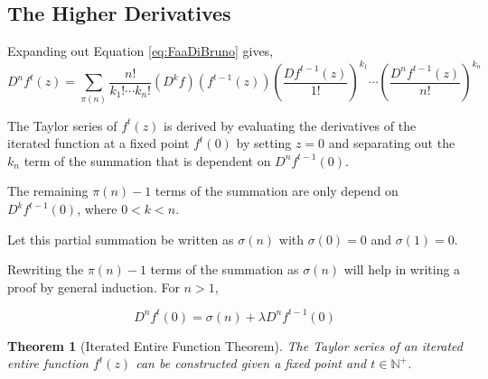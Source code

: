 \documentclass{article}
\newtheorem{theorem}{Theorem}[section]
\theoremstyle{definition}
\begin{document}
\subsection{The Higher Derivatives}  

Expanding out Equation \ref{eq:FaaDiBruno} gives,
\begin{equation}
    D^n f^t(z)= \sum_{\pi(n)} \frac{n!}{k_1! \cdots k_n!} 
(D^k f)(f^{t-1}(z))
\left(\frac{Df^{t-1}(z)}{1!}\right)^{k_1} \cdots
\left(\frac{D^n f^{t-1}(z)}{n!}\right)^{k_n}
\label{eq:DynamicalRecurranceEquation}
\end{equation}

The Taylor series of $f^t(z)$ is derived by evaluating
the derivatives of the iterated function at a fixed point 
$f^t(0)$ by setting $z=0$ and separating out the $k_n$ 
term of the summation that is dependent on $D^n f^{t-1}(0)$.

The remaining $\pi(n)-1$ terms of the summation are only depend on \\ 
$D^k f^{t-1}(0)$, where $0<k<n$. 

Let this partial summation be written as $\sigma(n)$ with $\sigma(0)=0$ and $\sigma(1) = 0$.

Rewriting the $\pi(n)-1$ terms of the summation as $\sigma(n)$ will help in writing a proof by general induction. For $n>1$,

\begin{equation}
D^n f^t(0)=\sigma(n) + \lambda D^n f^{t-1}(0) 
\label{eq:Linear Equation}
\end{equation}
\qedhere

\begin{theorem}[Iterated Entire Function Theorem]

The Taylor series of an iterated entire function $f^t(z)$ can be constructed given a fixed point and $t \in \mathbb{N^+}$.
\end{theorem}
\end{document}
